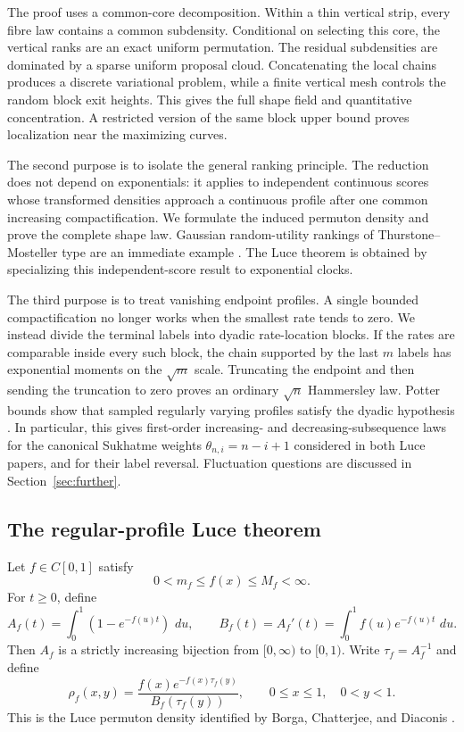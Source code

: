\documentclass[11pt]{article}
\theoremstyle{remark}
\newcommand{\dd}{\,d}
\begin{document}
The proof uses a common-core decomposition.  Within a thin vertical strip,
every fibre law contains a common subdensity.  Conditional on selecting
this core, the vertical ranks are an exact uniform permutation.  The residual
subdensities are dominated by a sparse uniform proposal cloud.  Concatenating
the local chains produces a discrete variational problem, while a finite
vertical mesh controls the random block exit heights.  This gives the full
shape field and quantitative concentration.  A restricted version of the
same block upper bound proves localization near the maximizing curves.

The second purpose is to isolate the general ranking principle.  The reduction
does not depend on exponentials: it applies to independent continuous scores
whose transformed densities approach a continuous profile after one common
increasing compactification.
We formulate the induced permuton density and prove the complete shape law.
Gaussian random-utility rankings of Thurstone--Mosteller type are an immediate
example \cite{Thurstone1927,Mosteller1951}.  The Luce theorem is obtained by
specializing this independent-score result to exponential clocks.

The third purpose is to treat vanishing endpoint profiles.  A single bounded
compactification no longer works when the smallest rate tends to zero.  We
instead divide the terminal labels into dyadic rate-location blocks.  If the
rates are comparable inside every such block, the chain supported by the last
$m$ labels has exponential moments on the $\sqrt m$ scale.  Truncating the
endpoint and then sending the truncation to zero proves an ordinary
$\sqrt n$ Hammersley law.  Potter bounds show that sampled regularly varying
profiles satisfy the dyadic hypothesis \cite{BinghamGoldieTeugels1987}.  In
particular, this gives first-order increasing- and decreasing-subsequence laws
for the canonical Sukhatme weights $\theta_{n,i}=n-i+1$ considered in both
Luce papers, and for their label reversal.  Fluctuation questions are discussed
in Section~\ref{sec:further}.

\subsection{The regular-profile Luce theorem}

Let $f\in C[0,1]$ satisfy
\[
        0<m_f\le f(x)\le M_f<\infty.
\]
For $t\ge0$, define
\begin{equation}\label{eq:A-B-def}
        A_f(t)=\int_0^1(1-e^{-f(u)t})\,\dd u,
        \qquad
        B_f(t)=A_f'(t)=\int_0^1 f(u)e^{-f(u)t}\,\dd u.
\end{equation}
Then $A_f$ is a strictly increasing bijection from $[0,\infty)$ to $[0,1)$.
Write $\tau_f=A_f^{-1}$ and define
\begin{equation}\label{eq:rho-def-intro}
        \rho_f(x,y)
        =\frac{f(x)e^{-f(x)\tau_f(y)}}{B_f(\tau_f(y))},
        \qquad 0\le x\le1,\quad 0<y<1.
\end{equation}
This is the Luce permuton density identified by Borga, Chatterjee, and
Diaconis \cite[Proposition~2.2]{BorgaChatterjeeDiaconis2026}.
\end{document}
